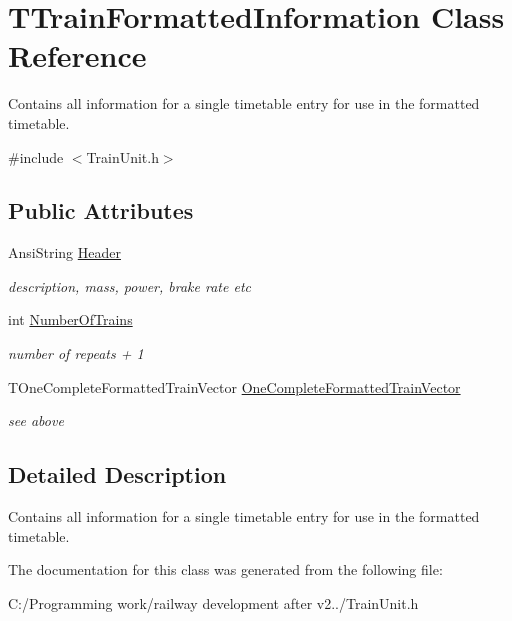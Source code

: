 \hypertarget{class_t_train_formatted_information}{}\section{T\+Train\+Formatted\+Information Class Reference}
\label{class_t_train_formatted_information}


Contains all information for a single timetable entry for use in the formatted timetable.  




{\ttfamily \#include $<$Train\+Unit.\+h$>$}

\subsection*{Public Attributes}
\begin{DoxyCompactItemize}
\item 
\mbox{\label{class_t_train_formatted_information_a03b72f64d740876d99d1080b8d355441}} 
Ansi\+String \mbox{\hyperlink{class_t_train_formatted_information_a03b72f64d740876d99d1080b8d355441}{Header}}
\begin{DoxyCompactList}\small\item\em description, mass, power, brake rate etc \end{DoxyCompactList}\item 
\mbox{\label{class_t_train_formatted_information_a2f5bc8f1ff9b154a381660639c40dada}} 
int \mbox{\hyperlink{class_t_train_formatted_information_a2f5bc8f1ff9b154a381660639c40dada}{Number\+Of\+Trains}}
\begin{DoxyCompactList}\small\item\em number of repeats + 1 \end{DoxyCompactList}\item 
\mbox{\label{class_t_train_formatted_information_a7ed8168782c7afd5f7b42b41f5515c8f}} 
T\+One\+Complete\+Formatted\+Train\+Vector \mbox{\hyperlink{class_t_train_formatted_information_a7ed8168782c7afd5f7b42b41f5515c8f}{One\+Complete\+Formatted\+Train\+Vector}}
\begin{DoxyCompactList}\small\item\em see above \end{DoxyCompactList}\end{DoxyCompactItemize}


\subsection{Detailed Description}
Contains all information for a single timetable entry for use in the formatted timetable. 

The documentation for this class was generated from the following file\+:\begin{DoxyCompactItemize}
\item 
C\+:/\+Programming work/railway development after v2../Train\+Unit.\+h\end{DoxyCompactItemize}
